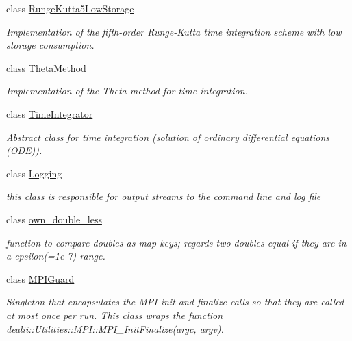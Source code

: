 \begin{DoxyCompactItemize}
class \hyperlink{classnatrium_1_1RungeKutta5LowStorage}{RungeKutta5LowStorage}
\begin{DoxyCompactList}\small\item\em Implementation of the fifth-\/order Runge-\/Kutta time integration scheme with low storage consumption. \item\end{DoxyCompactList}\item 
class \hyperlink{classnatrium_1_1ThetaMethod}{ThetaMethod}
\begin{DoxyCompactList}\small\item\em Implementation of the Theta method for time integration. \item\end{DoxyCompactList}\item 
class \hyperlink{classnatrium_1_1TimeIntegrator}{TimeIntegrator}
\begin{DoxyCompactList}\small\item\em Abstract class for time integration (solution of ordinary differential equations (ODE)). \item\end{DoxyCompactList}\item 
class \hyperlink{classnatrium_1_1Logging}{Logging}
\begin{DoxyCompactList}\small\item\em this class is responsible for output streams to the command line and log file \item\end{DoxyCompactList}\item 
class \hyperlink{classnatrium_1_1own__double__less}{own\_\-double\_\-less}
\begin{DoxyCompactList}\small\item\em function to compare doubles as map keys; regards two doubles equal if they are in a epsilon(=1e-\/7)-\/range. \item\end{DoxyCompactList}\item 
class \hyperlink{classnatrium_1_1MPIGuard}{MPIGuard}
\begin{DoxyCompactList}\small\item\em Singleton that encapsulates the MPI init and finalize calls so that they are called at most once per run. This class wraps the function dealii::Utilities::MPI::MPI\_\-InitFinalize(argc, argv). \item\end{DoxyCompactList}\item 

\end{DoxyCompactItemize}
